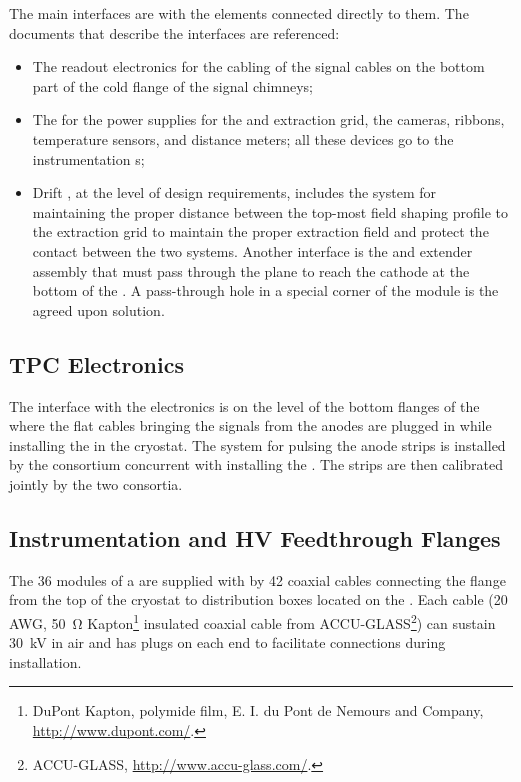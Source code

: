 The main  interfaces are with the elements connected directly to them. The documents that describe the interfaces are referenced:
\begin{itemize}
\item The readout electronics for the cabling of the signal cables on the bottom part of the cold 
flange of the signal chimneys; 
\item The  for the power supplies for the  and extraction grid, the cameras,  ribbons, temperature sensors, and distance meters; all these devices go to the  instrumentation \fdth{}s; 

\item Drift , at the level of design requirements, includes the system for maintaining the proper distance between the top-most field shaping profile to the extraction grid to maintain the proper extraction field and protect the contact between the two systems. Another interface is the  \fdth{} and extender assembly that must pass through the  plane to reach the cathode at the bottom of the .  A pass-through hole in a special corner of the  module is the agreed upon solution.
\end{itemize}

\subsection{TPC Electronics}
\label{sec:dp-crp-intfc-elec}

The interface with the   electronics is on the level of the bottom flanges of the  where the flat cables bringing the signals from the anodes are plugged in while installing the  in the cryostat. The system for 
pulsing the anode strips is installed by the  consortium 
concurrent with installing the . 
The strips are then calibrated jointly by the two consortia.

\subsection{Instrumentation and HV Feedthrough Flanges}
\label{sec:dp-crp-intfc-FT}

The \num{36}  modules of a  are supplied with  by \num{42} coaxial cables 
connecting the \fdth flange from the top of the cryostat to distribution boxes located on the . Each cable (\num{20}\,AWG, \SI{50}{\ohm} Kapton\footnote{DuPont\texttrademark{} Kapton, polymide film,  E. I. du Pont de Nemours and Company,  \url{http://www.dupont.com/}.} insulated coaxial cable from ACCU-GLASS\footnote{ACCU-GLASS\texttrademark{}, \url{http://www.accu-glass.com/}.}) can sustain \SI{30}{kV} in air and has  plugs on each end to facilitate connections during  installation.


